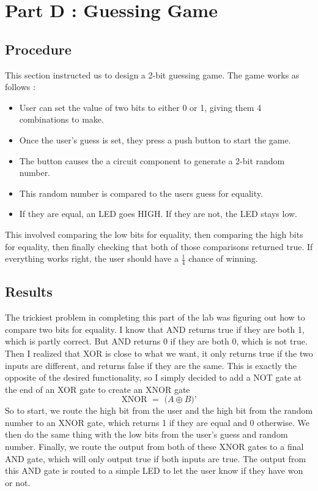 \documentclass[a4paper,11pt]{article}
\begin{document}

\section{Part D : Guessing Game}
\subsection{Procedure}
This section instructed us to design a 2-bit guessing game. The game works as follows  :
\begin{itemize}
\item User can set the value of two bits to either 0 or 1, giving them 4 combinations to make. 
\item Once the user's guess is set, they press a push button to start the game.
\item The button causes the a circuit component to generate a 2-bit random number.
\item This random number is compared to the users guess for equality.
\item If they are equal, an LED goes HIGH. If they are not, the LED stays low.
\end{itemize}

This involved comparing the low bits for equality, then comparing the high bits for equality, then finally checking that both of those comparisons returned true. If everything works right, the user should have a $\frac{1}{4}$ chance of winning.
\subsection{Results}
The trickiest problem in completing this part of the lab was figuring out how to compare two bits for equality. I know that AND returns true if they are both 1, which is partly correct. But AND returns 0 if they are both 0, which is not true. Then I realized that XOR is close to what we want, it only returns true if the two inputs are different, and returns false if they are the same. This is exactly the opposite of the desired functionality, so I simply decided to add a NOT gate at the end of an XOR gate to create an XNOR gate 
\[ \text{XNOR $=$ ($A \oplus B$)'}\]
So to start, we route the high bit from the user and the high bit from the random number to an XNOR gate, which returns 1 if they are equal and 0 otherwise. We then do the same thing with the low bits from the user's guess and random number. Finally, we route the output from both of these XNOR gates to a final AND gate, which will only output true if both inputs are true. The output from this AND gate is routed to a simple LED to let the user know if they have won or not.
\end{document}
